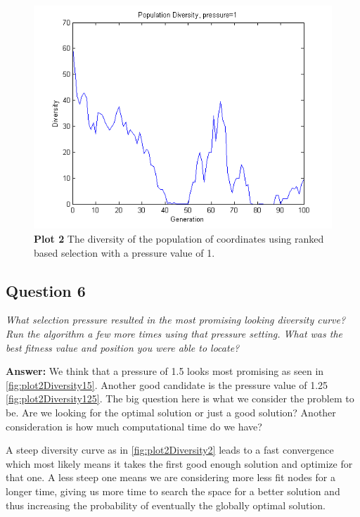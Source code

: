 \documentclass[a4paper]{article}
\begin{document}
\begin{figure}[H] %
	\includegraphics[scale=0.7]{divPress1.png}
	\caption{\label{fig:plot2Diversity1}\textbf{Plot 2} The diversity of the population of coordinates using ranked based selection with a pressure value of 1.}
\end{figure}

\subsection*{Question 6}
\emph{What selection pressure resulted in the most promising looking
diversity curve? Run the algorithm a few more times using that pressure setting. What was the best fitness value and position you were able to locate?}

\textbf{Answer:} We think that a pressure of 1.5 looks most promising as seen in \ref{fig:plot2Diversity15}. Another good candidate is the pressure value of 1.25 \ref{fig:plot2Diversity125}. The big question here is what we consider the problem to be. Are we looking for the optimal solution or just a good solution? Another consideration is how much computational time do we have? 

A steep diversity curve as in \ref{fig:plot2Diversity2} leads to a fast convergence which most likely means it takes the first good enough solution and optimize for that one. A less steep one means we are considering more less fit nodes for a longer time, giving us more time to search the space for a better solution and thus increasing the probability of eventually the globally optimal solution.
\end{document}
